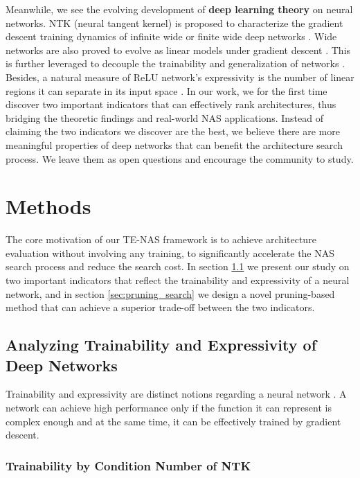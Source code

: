 \documentclass{article} \usepackage{iclr2021_conference,times}
\begin{document}
Meanwhile, we see the evolving development of \textbf{deep learning theory} on neural networks.
NTK (neural tangent kernel) is proposed to characterize the gradient descent training dynamics of infinite wide \citep{jacot2018neural} or finite wide deep networks \citep{hanin2019finite}. Wide networks are also proved to evolve as linear models under gradient descent \citep{lee2019wide}. This is further leveraged to decouple the trainability and generalization of networks \citep{xiao2019disentangling}. Besides, a natural measure of ReLU network's expressivity is the number of linear regions it can separate in its input space \citep{raghu2017expressive,montufar2017notes,serra2018bounding,hanin2019complexity,hanin2019deep,xiong2020number}.
In our work, we for the first time discover two important indicators that can effectively rank architectures, thus bridging the theoretic findings and real-world NAS applications. Instead of claiming the two indicators we discover are the best, we believe there are more meaningful properties of deep networks that can benefit the architecture search process. We leave them as open questions and encourage the community to study.




\section{Methods}

The core motivation of our TE-NAS framework is to achieve architecture evaluation without involving any training, to significantly accelerate the NAS search process and reduce the search cost. In section \ref{sec:train_express} we present our study on two important indicators that reflect the trainability and expressivity of a neural network, and in section \ref{sec:pruning_search} we design a novel pruning-based method that can achieve a superior trade-off between the two indicators.

\subsection{Analyzing Trainability and Expressivity of Deep Networks}\label{sec:train_express}
Trainability and expressivity are distinct notions regarding a neural network \citep{xiao2019disentangling}. A network can achieve high performance only if the function it can represent is complex enough and at the same time, it can be effectively trained by gradient descent.


\subsubsection{Trainability by Condition Number of NTK}
\end{document}
